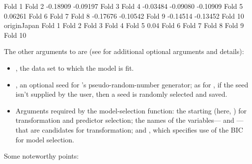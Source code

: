 \documentclass[
]{jss}
\providecommand{\tightlist}{%
  \setlength{\itemsep}{0pt}\setlength{\parskip}{0pt}}
\begin{document}
\begin{CodeChunk}
\begin{CodeOutput}
Fold 1                                                                
Fold 2      -0.18909     -0.09197                                     
Fold 3                                                                
Fold 4      -0.03484                  -0.09080   -0.10909             
Fold 5                                                         0.06261
Fold 6                                                                
Fold 7                                                                
Fold 8      -0.17676     -0.10542                                     
Fold 9      -0.14514     -0.13452                                     
Fold 10                                                               
        originJapan
Fold 1             
Fold 2             
Fold 3             
Fold 4             
Fold 5         0.04
Fold 6             
Fold 7             
Fold 8             
Fold 9             
Fold 10            
\end{CodeOutput}
\end{CodeChunk}

The other arguments to  are (see  for
additional optional arguments and details):

\begin{itemize}
\tightlist
\item
  , the data set to which the model is fit.
\item
  , an optional seed for 's pseudo-random-number
  generator; as for , if the seed isn't supplied by the user,
  then a seed is randomly selected and saved.
\item
  Arguments required by the model-selection function: the starting
   (here, ) for transformation and
  predictor selection; the names of the variables---
  and ---that are candidates for transformation; and
  , which specifies use of the BIC for model selection.
\end{itemize}

Some noteworthy points:
\end{document}
